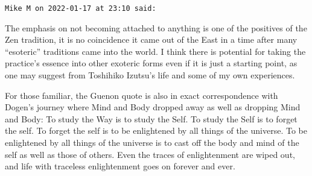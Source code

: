 \begin{footnotesize}\begin{sffamily}

\texttt{Mike M on 2022-01-17 at 23:10 said: }

The emphasis on not becoming attached to anything is one of the positives of the Zen tradition, it is no coincidence it came out of the East in a time after many “esoteric” traditions came into the world. I think there is potential for taking the practice's essence into other exoteric forms even if it is just a starting point, as one may suggest from Toshihiko Izutsu's life and some of my own experiences.

For those familiar, the Guenon quote is also in exact correspondence with Dogen's journey where Mind and Body dropped away as well as dropping Mind and Body: To study the Way is to study the Self. To study the Self is to forget the self. To forget the self is to be enlightened by all things of the universe. To be enlightened by all things of the universe is to cast off the body and mind of the self as well as those of others. Even the traces of enlightenment are wiped out, and life with traceless enlightenment goes on forever and ever.

\end{sffamily}\end{footnotesize}